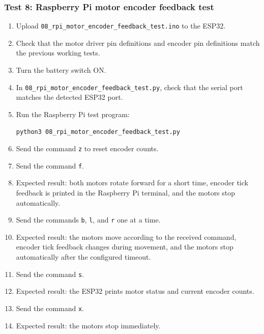 \documentclass[12pt]{article}
\begin{document}
\subsubsection{Test 8: Raspberry Pi motor encoder feedback test}
\begin{enumerate}
    \item Upload \texttt{08\_rpi\_motor\_encoder\_feedback\_test.ino} to the ESP32.
    \item Check that the motor driver pin definitions and encoder pin definitions match the previous working tests.
    \item Turn the battery switch ON.
    \item In \texttt{08\_rpi\_motor\_encoder\_feedback\_test.py}, check that the serial port matches the detected ESP32 port.
    \item Run the Raspberry Pi test program:
    \begin{verbatim}
python3 08_rpi_motor_encoder_feedback_test.py
    \end{verbatim}
    \item Send the command \texttt{z} to reset encoder counts.
    \item Send the command \texttt{f}.
    \item Expected result: both motors rotate forward for a short time, encoder tick feedback is printed in the Raspberry Pi terminal, and the motors stop automatically.
    \item Send the commands \texttt{b}, \texttt{l}, and \texttt{r} one at a time.
    \item Expected result: the motors move according to the received command, encoder tick feedback changes during movement, and the motors stop automatically after the configured timeout.
    \item Send the command \texttt{s}.
    \item Expected result: the ESP32 prints motor status and current encoder counts.
    \item Send the command \texttt{x}.
    \item Expected result: the motors stop immediately.
\end{enumerate}
\clearpage
\end{document}
